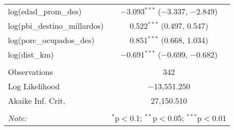 \begin{table}[H]
\begin{tabular}{@{\extracolsep{5pt}}lc}
  log(edad\_prom\_des) & $-$3.093$^{***}$ ($-$3.337, $-$2.849) \\ 
  log(pbi\_destino\_millardos) & 0.522$^{***}$ (0.497, 0.547) \\ 
  log(porc\_ocupados\_des) & 0.851$^{***}$ (0.668, 1.034) \\ 
  log(dist\_km) & $-$0.691$^{***}$ ($-$0.699, $-$0.682) \\ 
 \hline \\[-1.8ex] 
Observations & 342 \\ 
Log Likelihood & $-$13,551.250 \\ 
Akaike Inf. Crit. & 27,150.510 \\ 
\hline 
\hline \\[-1.8ex] 
\textit{Note:}  & \multicolumn{1}{r}{$^{*}$p$<$0.1; $^{**}$p$<$0.05; $^{***}$p$<$0.01} \\ 
\end{tabular} 
\end{table} 
